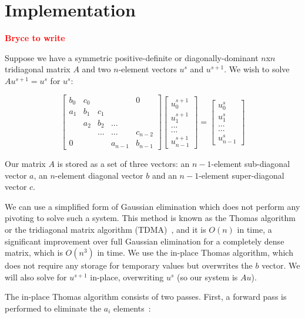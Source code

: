 \documentclass[conference]{IEEEtran}
\newcommand{\fix}[1]{{\bf \textcolor {red}{#1}}}
\begin{document}
\section{Implementation}
\fix{Bryce to write}

Suppose we have a symmetric positive-definite or diagonally-dominant $n$x$n$
tridiagonal matrix $A$ and two $n$-element vectors $u^{s}$ and $u^{s+1}$. We
wish to solve $Au^{s+1} = u^{s}$ for $u^{s}$:

\[
\begin{bmatrix}
b_0 & c_0 &     &         & 0       \\
a_1 & b_1 & c_1 &         &         \\
    & a_2 & b_2 & ...     &         \\
    &     & ... & ...     & c_{n-2} \\
0   &     &     & a_{n-1} & b_{n-1}
\end{bmatrix}
\begin{bmatrix}
u^{s+1}_0     \\
u^{s+1}_1     \\
...     \\
...     \\
u^{s+1}_{n-1}
\end{bmatrix}
=
\begin{bmatrix}
u^{s}_0     \\
u^{s}_1     \\
...     \\
...     \\
u^{s}_{n-1}
\end{bmatrix}
\]

Our matrix $A$ is stored as a set of three vectors: an $n-1$-element
sub-diagonal vector $a$, an $n$-element diagonal vector $b$ and an $n-1$-element
super-diagonal vector $c$.

We can use a simplified form of Gaussian elimination which does not perform any
pivoting to solve such a system. This method is known as the Thomas algorithm
or the tridiagonal matrix algorithm (TDMA)~\cite{TDMA}, and it is \(O(n)\) in time,
a significant improvement over full Gaussian elimination for a completely dense
matrix, which is \(O(n^3)\) in time. We use the in-place Thomas algorithm,
which does not require any storage for temporary values but overwrites the $b$
vector. We will also solve for $u^{s+1}$ in-place, overwriting $u^{s}$ (so our
system is $Au$).

The in-place Thomas algorithm consists of two passes. First, a forward pass is
performed to eliminate the $a_i$ elements~\cite{??}:
\end{document}
